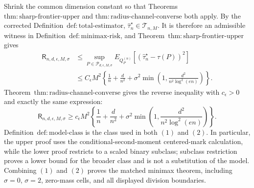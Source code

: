 Shrink the common dimension constant so that Theorems~\(\mathrm{thm:sharp\text{-}frontier\text{-}upper}\) and \(\mathrm{thm:radius\text{-}channel\text{-}converse}\) both apply.  By the corrected Definition~\(\mathrm{def:total\text{-}estimator}\), \(\widehat\tau_n^{\star}\in\mathcal T_{n,M}\).  It is therefore an admissible witness in Definition~\(\mathrm{def:minimax\text{-}risk}\), and Theorem~\(\mathrm{thm:sharp\text{-}frontier\text{-}upper}\) gives
\[
\begin{aligned}
 \mathsf R_{n,d,\epsilon,M,\sigma}
 &\le\sup_{P\in\mathcal P_{d,\epsilon,M,\sigma}}
 E_{Q_P^{(n)}}[(\widehat\tau_n^{\star}-\tau(P))^2]\\
 &\le C_{\epsilon}M^2\left\{
 \frac1n+\frac d{n^2}
 +\sigma^2\min\left(1,\frac{d^2}{n^2\log^2(en)}\right)
 \right\}.
\end{aligned}
\tag{1}
\]
Theorem~\(\mathrm{thm:radius\text{-}channel\text{-}converse}\) gives the reverse inequality with \(c_{\epsilon}>0\) and exactly the same expression:
\[
 \mathsf R_{n,d,\epsilon,M,\sigma}
 \ge c_{\epsilon}M^2\left\{
 \frac1n+\frac d{n^2}
 +\sigma^2\min\left(1,\frac{d^2}{n^2\log^2(en)}\right)
 \right\}.
\tag{2}
\]
Definition~\(\mathrm{def:model\text{-}class}\) is the class used in both \((1)\) and \((2)\).  In particular, the upper proof uses the conditional-second-moment centered-mark calculation, while the lower proof restricts to a scaled binary subclass; subclass restriction proves a lower bound for the broader class and is not a substitution of the model.  Combining \((1)\) and \((2)\) proves the matched minimax theorem, including \(\sigma=0\), \(\sigma=2\), zero-mass cells, and all displayed division boundaries.